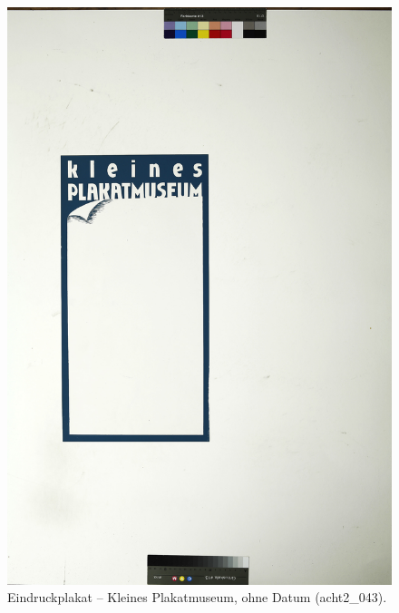 \documentclass[a4paper,12pt,ngerman]{article}
\begin{document}
\newpage
\begin{figure}[ht]
\includegraphics[width=\linewidth]{Abbildung_3_(acht2_043)}
\centering
\caption{Eindruckplakat – Kleines Plakatmuseum, ohne Datum (acht2\_043).}
\end{figure}
\end{document}
